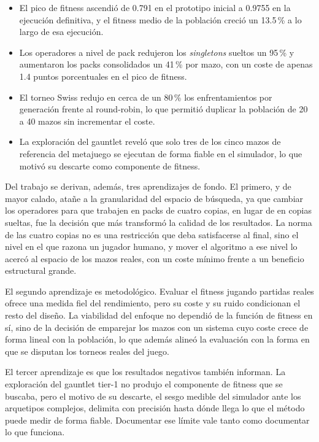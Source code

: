 \begin{itemize}
    \item El pico de fitness ascendió de 0.791 en el prototipo inicial a 0.9755 en la ejecución definitiva, y el fitness medio de la población creció un 13.5\,\% a lo largo de esa ejecución.
    \item Los operadores a nivel de pack redujeron los \emph{singletons} sueltos un 95\,\% y aumentaron los packs consolidados un 41\,\% por mazo, con un coste de apenas 1.4 puntos porcentuales en el pico de fitness.
    \item El torneo Swiss redujo en cerca de un 80\,\% los enfrentamientos por generación frente al round-robin, lo que permitió duplicar la población de 20 a 40 mazos sin incrementar el coste.
    \item La exploración del gauntlet reveló que solo tres de los cinco mazos de referencia del metajuego se ejecutan de forma fiable en el simulador, lo que motivó su descarte como componente de fitness.
\end{itemize}

Del trabajo se derivan, además, tres aprendizajes de fondo. El primero, y de mayor calado, atañe a la granularidad del espacio de búsqueda, ya que cambiar los operadores para que trabajen en packs de cuatro copias, en lugar de en copias sueltas, fue la decisión que más transformó la calidad de los resultados. La norma de las cuatro copias no es una restricción que deba satisfacerse al final, sino el nivel en el que razona un jugador humano, y mover el algoritmo a ese nivel lo acercó al espacio de los mazos reales, con un coste mínimo frente a un beneficio estructural grande.

El segundo aprendizaje es metodológico. Evaluar el fitness jugando partidas reales ofrece una medida fiel del rendimiento, pero su coste y su ruido condicionan el resto del diseño. La viabilidad del enfoque no dependió de la función de fitness en sí, sino de la decisión de emparejar los mazos con un sistema cuyo coste crece de forma lineal con la población, lo que además alineó la evaluación con la forma en que se disputan los torneos reales del juego.

El tercer aprendizaje es que los resultados negativos también informan. La exploración del gauntlet tier-1 no produjo el componente de fitness que se buscaba, pero el motivo de su descarte, el sesgo medible del simulador ante los arquetipos complejos, delimita con precisión hasta dónde llega lo que el método puede medir de forma fiable. Documentar ese límite vale tanto como documentar lo que funciona.

